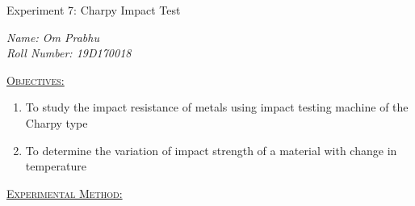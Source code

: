 \documentclass[a4paper, 11pt]{article}
\begin{document}
\begin{center}
	{\Large \sc Experiment 7: Charpy Impact Test}
\end{center}
\textit{Name: Om Prabhu\\
Roll Number: 19D170018}
\vspace{-1.5mm}

\hrulefill
\vspace{2mm}

\underline{\textsc{Objectives:}}
\vspace{-1mm}

\begin{enumerate}[label=(\alph*)]
	\itemsep0em
	\item To study the impact resistance of metals using impact testing machine of the Charpy type
	\item To determine the variation of impact strength of a material with change in temperature
\end{enumerate}
\vspace{2mm}

\underline{\textsc{Experimental Method:}} 
\vspace{-2mm}
\end{document}
